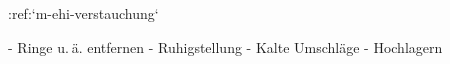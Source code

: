 :ref:`m-ehi-verstauchung`
\begin{itemize}
  -   Ringe u. ä. entfernen
  -   Ruhigstellung
  -   Kalte Umschläge
  -   Hochlagern %
\end{itemize}